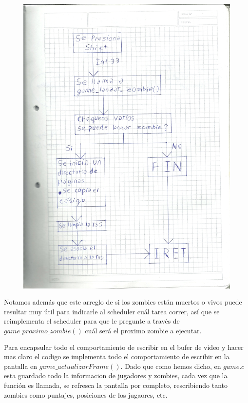 \documentclass[a4paper]{article}
\begin{document}
\begin{figure}[h!]
  \begin{center}
\includegraphics[scale=0.7]{Dibujos/dibujo1.jpg}\\
  \end{center}
\end{figure}

Notamos además que este arreglo de si los zombies están muertos o vivos puede resultar muy útil para indicarle al scheduler cuál tarea correr, así que se reimplementa el scheduler para que le pregunte a través de $game\_ proximo\_ zombie()$ cuál será el proximo zombie a ejecutar.

Para encapsular todo el comportamiento de escribir en el bufer de video y hacer mas claro el codigo se implementa todo el comportamiento de escribir en la pantalla en $game\_actualizarFrame()$. Dado que como hemos dicho, en $game.c$ esta guardado todo la informacion de jugadores y zombies, cada vez que la función es llamada, se refresca la pantalla por completo, rescribiendo tanto zombies como puntajes, posiciones de los jugaores, etc.
\end{document}
